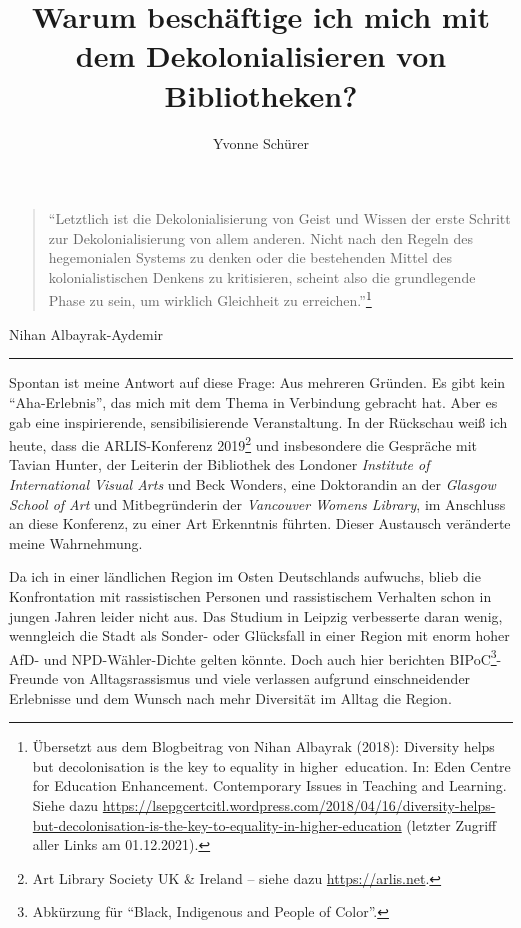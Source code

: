 \documentclass[a4paper,
fontsize=11pt,
oneside,
numbers=noperiodatend,
parskip=half-,
bibliography=totoc,
final
]{scrartcl}
\title{\LARGE{Warum beschäftige ich mich mit dem Dekolonialisieren von Bibliotheken?}}%
\author{Yvonne Schürer} %
\date{}
\begin{document}
\maketitle
\thispagestyle{fancyplain} 


\begin{quote}
\enquote{Letztlich ist die Dekolonialisierung von Geist und Wissen der erste
Schritt zur Dekolonialisierung von allem anderen. Nicht nach den Regeln
des hegemonialen Systems zu denken oder die bestehenden Mittel des
kolonialistischen Denkens zu kritisieren, scheint also die grundlegende
Phase zu sein, um wirklich Gleichheit zu erreichen.}\footnote{Übersetzt
  aus dem Blogbeitrag von Nihan Albayrak (2018): Diversity helps but
  decolonisation is the key to equality in higher~education. In: Eden
  Centre for Education Enhancement. Contemporary Issues in Teaching and
  Learning. Siehe dazu
  \url{https://lsepgcertcitl.wordpress.com/2018/04/16/diversity-helps-but-decolonisation-is-the-key-to-equality-in-higher-education}
  (letzter Zugriff aller Links am 01.12.2021).}
\end{quote}
\begin{flushright}Nihan Albayrak-Aydemir\end{flushright}

\begin{center}\rule{0.5\linewidth}{0.5pt}\end{center}

Spontan ist meine Antwort auf diese Frage: Aus mehreren Gründen. Es gibt
kein \enquote{Aha-Erlebnis}, das mich mit dem Thema in Verbindung
gebracht hat. Aber es gab eine inspirierende, sensibilisierende
Veranstaltung. In der Rückschau weiß ich heute, dass die ARLIS-Konferenz
2019\footnote{Art Library Society UK \& Ireland -- siehe dazu
  \url{https://arlis.net}.} und insbesondere die Gespräche mit Tavian
Hunter, der Leiterin der Bibliothek des Londoner \emph{Institute of
International Visual Arts} und Beck Wonders, eine Doktorandin an der
\emph{Glasgow School of Art} und Mitbegründerin der \emph{Vancouver
Womens Library}, im Anschluss an diese Konferenz, zu einer Art
Erkenntnis führten. Dieser Austausch veränderte meine Wahrnehmung.

Da ich in einer ländlichen Region im Osten Deutschlands aufwuchs, blieb
die Konfrontation mit rassistischen Personen und rassistischem Verhalten
schon in jungen Jahren leider nicht aus. Das Studium in Leipzig
verbesserte daran wenig, wenngleich die Stadt als Sonder- oder
Glücksfall in einer Region mit enorm hoher AfD- und NPD-Wähler-Dichte
gelten könnte. Doch auch hier berichten BIPoC\footnote{Abkürzung für
  \enquote{Black, Indigenous and People of Color}.}-Freunde von
Alltagsrassismus und viele verlassen aufgrund einschneidender Erlebnisse
und dem Wunsch nach mehr Diversität im Alltag die Region.
\end{document}
